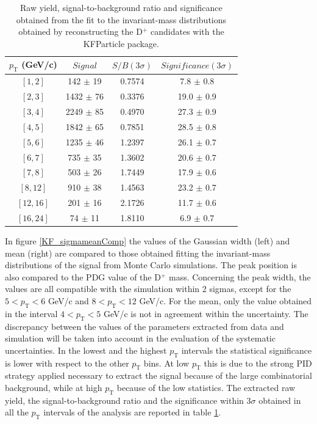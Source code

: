 \documentclass[b5paper,10pt,twoside,oldstyle,classica]{toptesi}
\newcommand{\pt}{p_\text{T}}
\begin{document}
\begin{table}[b]
\centering 
\begin{center} %
\renewcommand\arraystretch{1.1} 
\begin{tabular}{|c|c|c|c|}
\hline
$\pt$ (GeV/c) & $Signal$ & $S/B(3\sigma)$ & $Significance (3\sigma)$ \\
\hline
$[1,2]$ & 142 $\pm$ 19 & 0.7574 & 7.8 $\pm$ 0.8\\
$[2,3]$ & 1432 $\pm$ 76 & 0.3376 & 19.0 $\pm$ 0.9\\
$[3,4]$ & 2249 $\pm$ 85 & 0.4970 & 27.3 $\pm$ 0.9\\
$[4,5]$ & 1842 $\pm$ 65 & 0.7851 & 28.5 $\pm$ 0.8\\
$[5,6]$ & 1235 $\pm$ 46 & 1.2397 & 26.1 $\pm$ 0.7\\
$[6,7]$ & 735 $\pm$ 35 & 1.3602 & 20.6 $\pm$ 0.7\\
$[7,8]$ & 503 $\pm$ 26 & 1.7449 & 17.9 $\pm$ 0.6\\
$[8,12]$ & 910 $\pm$ 38 & 1.4563 & 23.2 $\pm$ 0.7\\
$[12,16]$ & 201 $\pm$ 16 & 2.1726 & 11.7 $\pm$ 0.6\\
$[16,24]$ & 74 $\pm$ 11 & 1.8110 & 6.9 $\pm$ 0.7\\
\hline
\end{tabular}
\caption{Raw yield, signal-to-background ratio and significance obtained from the fit to the invariant-mass distributions obtained by reconstructing the D$^+$ candidates with the KFParticle package.}
\label{raw_yields_KF_tab}
\end{center} 
\end{table} In figure \ref{KF_sigmameanComp} the values of the Gaussian width (left) and mean (right) are compared to those obtained fitting the invariant-mass distributions of the signal from Monte Carlo simulations. The peak position is also compared to the PDG value of the D$^+$ mass. Concerning the peak width, the values are all compatible with the simulation within 2 sigmas, except for the $5<\pt<6$ GeV/c and $8<\pt<12$ GeV/c. For the mean, only the value obtained in the interval $4<\pt<5$ GeV/c is not in agreement within the uncertainty. The discrepancy between the values of the parameters extracted from data and simulation will be taken into account in the evaluation of the systematic uncertainties. In the lowest and the highest $\pt$ intervals the statistical significance is lower with respect to the other $\pt$ bins. At low $\pt$ this is due to the strong PID strategy applied necessary to extract the signal because of the large combinatorial background, while at high $\pt$ because of the low statistics. The extracted raw yield, the signal-to-background ratio and the significance within $3\sigma$ obtained in all the $\pt$ intervals of the analysis are reported in table \ref{raw_yields_KF_tab}.
\end{document}
